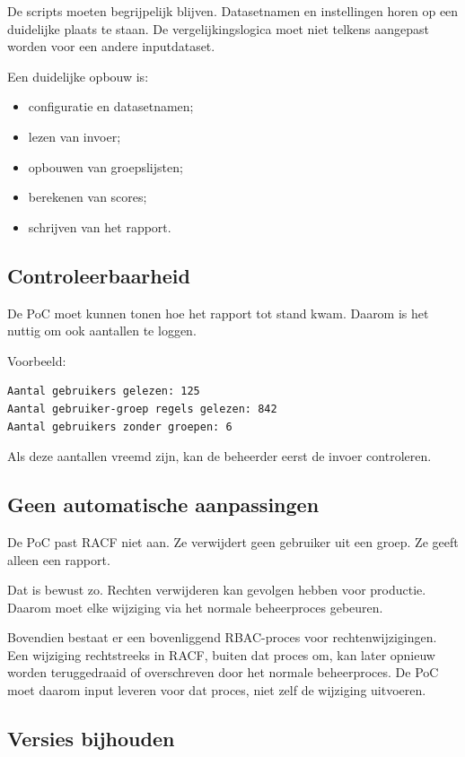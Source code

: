De scripts moeten begrijpelijk blijven. Datasetnamen en instellingen horen op een duidelijke plaats te staan. De vergelijkingslogica moet niet telkens aangepast worden voor een andere inputdataset.

Een duidelijke opbouw is:

\begin{itemize}
	\item configuratie en datasetnamen;
	\item lezen van invoer;
	\item opbouwen van groepslijsten;
	\item berekenen van scores;
	\item schrijven van het rapport.
\end{itemize}

\subsection*{Controleerbaarheid}

De PoC moet kunnen tonen hoe het rapport tot stand kwam. Daarom is het nuttig om ook aantallen te loggen.

Voorbeeld:

\begin{verbatim}
Aantal gebruikers gelezen: 125
Aantal gebruiker-groep regels gelezen: 842
Aantal gebruikers zonder groepen: 6
\end{verbatim}

Als deze aantallen vreemd zijn, kan de beheerder eerst de invoer controleren.

\subsection*{Geen automatische aanpassingen}

De PoC past RACF niet aan. Ze verwijdert geen gebruiker uit een groep. Ze geeft alleen een rapport.

Dat is bewust zo. Rechten verwijderen kan gevolgen hebben voor productie. Daarom moet elke wijziging via het normale beheerproces gebeuren.

Bovendien bestaat er een bovenliggend RBAC-proces voor rechtenwijzigingen. Een wijziging rechtstreeks in RACF, buiten dat proces om, kan later opnieuw worden teruggedraaid of overschreven door het normale beheerproces. De PoC moet daarom input leveren voor dat proces, niet zelf de wijziging uitvoeren.

\subsection*{Versies bijhouden}

